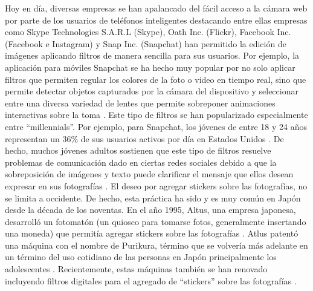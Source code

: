\documentclass[a4paper,openright,12pt]{report}
\begin{document}
Hoy en día, diversas empresas se han apalancado del fácil acceso a la cámara web
por parte de los usuarios de teléfonos inteligentes destacando entre ellas
empresas como Skype Technologies S.A.R.L (Skype), Oath Inc. (Flickr),
Facebook Inc. (Facebook e Instagram) y Snap Inc. (Snapchat) han permitido la
edición de imágenes aplicando filtros de manera sencilla para sus usuarios. Por
ejemplo, la aplicación para móviles Snapchat se ha hecho muy popular por no solo
aplicar filtros que permiten regular los colores de la foto o video en tiempo
real, sino que permite detectar objetos capturados por la cámara del dispositivo
y seleccionar entre una diversa variedad de lentes que permite sobreponer
animaciones interactivas sobre la toma \cite{snap2017prospectus}⁠. Este tipo de
filtros se han popularizado especialmente entre “millennials”. Por ejemplo, para
Snapchat, los jóvenes de entre 18 y 24 años representan un 36\% de sus usuarios
activos por día en Estados Unidos \cite{snap2017prospectus}⁠. De hecho, muchos
jóvenes adultos sostienen que este tipo de filtros resuelve problemas de
comunicación dado en ciertas redes sociales debido a que la sobreposición de
imágenes y texto puede clarificar el mensaje que ellos desean expresar en sus
fotografías \cite{vaterlaus2016snapchat}. El deseo por agregar stickers sobre
las fotografías, no se limita a occidente. De hecho, esta práctica ha sido y es
muy común en Japón desde la década de los noventas. En el año 1995, Altus, una
empresa japonesa, desarrolló un fotomatón (un quiosco para tomarse fotos,
generalmente insertando una moneda) que permitía agregar stickers sobre las
fotografías \cite{edwards2004photographs}. Atlus patentó una máquina con el
nombre de Purikura, término que se volvería más adelante en un término del uso
cotidiano de las personas en Japón principalmente los adolescentes
\cite{edwards2004photographs}. Recientemente, estas máquinas también se han
renovado incluyendo filtros digitales para el agregado de “stickers” sobre las
fotografías \cite{TheOrigi29}.\\
\end{document}
